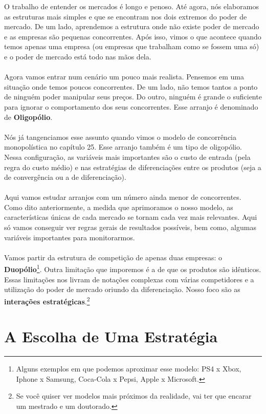 \documentclass[a4paper,11pt,oneside]{book}
\theoremstyle{definition}
\theoremstyle{break}
\begin{document}
O trabalho de entender os mercados é longo e penoso. Até agora, nós elaboramos as estruturas mais simples e que se encontram nos dois extremos do poder de mercado. De um lado, aprendemos a estrutura onde não existe poder de mercado e as empresas são pequenas concorrentes. Após isso, vimos o que acontece quando temos apenas uma empresa (ou empresas que trabalham como se fossem uma só) e o poder de mercado está todo nas mãos dela.
\\~\\
Agora vamos entrar num cenário um pouco mais realista. Pensemos em uma situação onde temos poucos concorrentes. De um lado, não temos tantos a ponto de ninguém poder manipular seus preços. Do outro, ninguém é grande o suficiente para ignorar o comportamento dos seus concorrentes. Esse arranjo é denominado de \textbf{Oligopólio}.
\\~\\
Nós já tangenciamos esse assunto quando vimos o modelo de concorrência monopolística no capítulo 25. Esse arranjo também é um tipo de oligopólio. Nessa configuração, as variáveis mais importantes são o custo de entrada (pela regra do custo médio) e nas estratégias de diferenciações entre os produtos (seja a de convergência ou a de diferenciação).
\\~\\
Aqui vamos estudar arranjos com um número ainda menor de concorrentes. Como dito anteriormente, a medida que aprimoramos o nosso modelo, as características únicas de cada mercado se tornam cada vez mais relevantes. Aqui só vamos conseguir ver regras gerais de resultados possíveis, bem como, algumas variáveis importantes para monitorarmos.
\\~\\
Vamos partir da estrutura de competição de apenas duas empresas: o \textbf{Duopólio}\footnote{Alguns exemplos em que podemos aproximar esse modelo: PS4 x Xbox, Iphone x Samsung, Coca-Cola x Pepsi, Apple x Microsoft.}. Outra limitação que imporemos é a de que os produtos são idênticos. Essas limitações nos livram de notações complexas com várias competidores e a utilização do poder de mercado oriundo da diferenciação. Nosso foco são as \textbf{interações estratégicas}.\footnote{Se você quiser ver modelos mais próximos da realidade, vai ter que encarar um mestrado e um doutorado.}

\section{A Escolha de Uma Estratégia}
\end{document}
